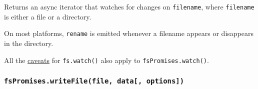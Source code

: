 Returns an async iterator that watches for changes on \texttt{filename},
where \texttt{filename} is either a file or a directory.

\begin{Shaded}
\begin{Highlighting}[]
\OperatorTok{=} \NormalTok{(}\NormalTok{)}\OperatorTok{;}

\OperatorTok{=}  \NormalTok{()}\OperatorTok{;}
\OperatorTok{=}\OperatorTok{;}
\NormalTok{(() }\KeywordTok{=\textgreater{}}\NormalTok{()}\OperatorTok{,} \NormalTok{)}\OperatorTok{;}

\NormalTok{(}\NormalTok{ () }\KeywordTok{=\textgreater{}}\NormalTok{ \{}
  \NormalTok{ \{}
    \OperatorTok{=} \NormalTok{(}\OperatorTok{,}\OperatorTok{;}
     \NormalTok{ (}  
      \NormalTok{(}\NormalTok{)}\OperatorTok{;}
\NormalTok{  \} }
     \OperatorTok{===} \NormalTok{)}
      \OperatorTok{;}
    \OperatorTok{;}
\NormalTok{  \}}
\NormalTok{\})()}\OperatorTok{;}
\end{Highlighting}
\end{Shaded}

On most platforms, \texttt{\textquotesingle{}rename\textquotesingle{}}
is emitted whenever a filename appears or disappears in the directory.

All the \hyperref[caveats]{caveats} for \texttt{fs.watch()} also apply
to \texttt{fsPromises.watch()}.

\subsubsection{\texorpdfstring{\texttt{fsPromises.writeFile(file,\ data{[},\ options{]})}}{fsPromises.writeFile(file, data{[}, options{]})}}\label{fspromises.writefilefile-data-options}

